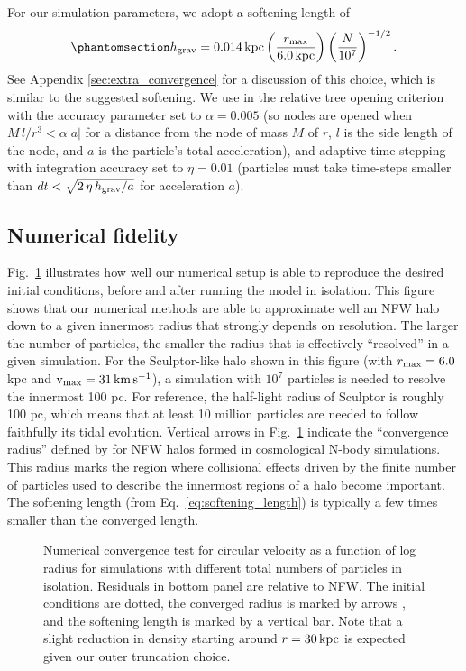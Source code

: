 For our simulation parameters, we adopt a softening length of
\begin{equation}\protect\phantomsection\label{eq:softening_length}{
h_{\rm grav} = 0.014\,{\rm kpc}\left(\frac{r_{\rm max}}{6.0\,{\rm kpc}}\right)\left(\frac{N}{10^7}\right)^{-1/2}.
}\end{equation} See Appendix \ref{sec:extra_convergence} for a
discussion of this choice, which is similar to the \citet{power+2003}
suggested softening. We use in \gadget{} the relative tree opening
criterion with the accuracy parameter set to \(\alpha =0.005\) (so nodes
are opened when \(M\,l/r^3 < \alpha |a|\) for a distance from the node
of mass \(M\) of \(r\), \(l\) is the side length of the node, and \(a\)
is the particle's total acceleration), and adaptive time stepping with
integration accuracy set to \(\eta=0.01\) (particles must take
time-steps smaller than \(dt < \sqrt{2\,\eta\,h_{\rm grav} / a}\) for
acceleration \(a\)).

\subsection{Numerical fidelity}\label{numerical-fidelity}

Fig.~\ref{fig:numerical_convergence} illustrates how well our numerical
setup is able to reproduce the desired initial conditions, before and
after running the model in isolation. This figure shows that our
numerical methods are able to approximate well an NFW halo down to a
given innermost radius that strongly depends on resolution. The larger
the number of particles, the smaller the radius that is effectively
``resolved'' in a given simulation. For the Sculptor-like halo shown in
this figure (with \(r_{\rm max} = 6.0\,\)kpc and \({\rm v}_{\rm max} = 31\,{\rm km\,s^{-1}}\)), a
simulation with \(10^7\) particles is needed to resolve the innermost
100 pc. For reference, the half-light radius of Sculptor is roughly 100
pc, which means that at least 10 million particles are needed to follow
faithfully its tidal evolution. Vertical arrows in
Fig.~\ref{fig:numerical_convergence} indicate the ``convergence radius''
defined by \citet[eq.\textasciitilde13]{power+2003} for NFW halos formed
in cosmological N-body simulations. This radius marks the region where
collisional effects driven by the finite number of particles used to
describe the innermost regions of a halo become important. The softening
length (from Eq.~\ref{eq:softening_length}) is typically a few times
smaller than the converged length.

\begin{figure}
\centering
{}
\caption[Numerical convergence of the N-body simulation]{Numerical
convergence test for circular velocity as a function of log radius for
simulations with different total numbers of particles in isolation.
Residuals in bottom panel are relative to NFW. The initial conditions
are dotted, the converged radius is marked by arrows \citep[eq.
13,][]{power+2003}, and the softening length is marked by a vertical
bar. Note that a slight reduction in density starting around
\(r = 30\,{\rm kpc}\) is expected given our outer truncation
choice.}\label{fig:numerical_convergence}
\end{figure}

